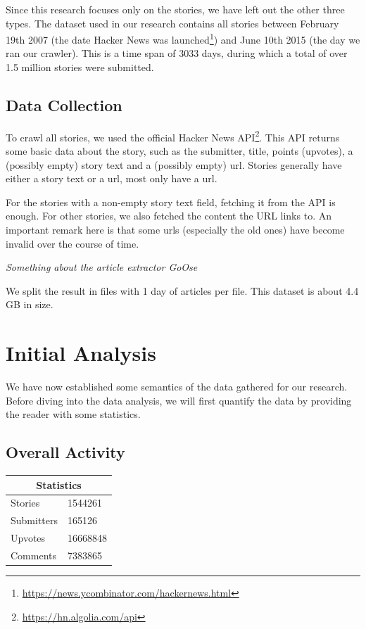 Since this research focuses only on the stories, we have left out the other three types. The dataset used in our research contains all stories between February 19th 2007 (the date Hacker News was launched\footnote{\url{https://news.ycombinator.com/hackernews.html}}) and June 10th 2015 (the day we ran our crawler). This is a time span of 3033 days, during which a total of over 1.5 million stories were submitted.

\subsection{Data Collection}
To crawl all stories, we used the official Hacker News API\footnote{\url{https://hn.algolia.com/api}}. This API returns some basic data about the story, such as the submitter, title, points (upvotes), a (possibly empty) story text and a (possibly empty) url. Stories generally have either a story text or a url, most only have a url.

For the stories with a non-empty story text field, fetching it from the API is enough. For other stories, we also fetched the content the URL links to. An important remark here is that some urls (especially the old ones) have become invalid over the course of time.

\textit{Something about the article extractor GoOse}

We split the result in files with 1 day of articles per file. This dataset is about 4.4 GB in size.

\section{Initial Analysis}
We have now established some semantics of the data gathered for our research. Before diving into the data analysis, we will first quantify the data by providing the reader with some statistics.

\subsection{Overall Activity}

\begin{center}
    \begin{tabular}{|p{3cm}|p{3cm}|}
        \hline
        \multicolumn{2}{|c|}{Statistics} \\
        \hline
         Stories & 1544261 \\ 
         Submitters & 165126 \\ 
         Upvotes & 16668848 \\ 
         Comments & 7383865 \\
         \hline
    \end{tabular}
\end{center}

